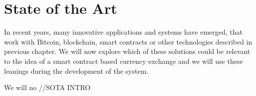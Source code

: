 \section{State of the Art}\label{sec:SOTA}
% 
In recent years, many innovative applications and systems have emerged, that work with Bitcoin, blockchain, smart contracts or other technologies described in previous chapter. We will now explore which of these solutions could be relevant to the idea of a smart contract based currency exchange and we will use these leanings during the development of the system.

We will no //SOTA INTRO


% 

% 

% 

% 
